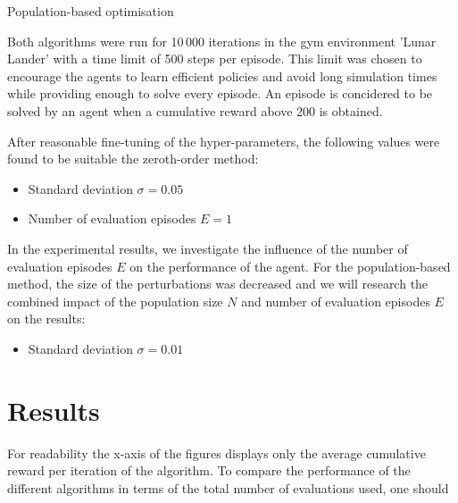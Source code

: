 \documentclass[10pt]{article}
\begin{document}
\begin{algorithm}
    \caption{Population-based optimisation}
    \label{alg:population}
\end{algorithm}

Both algorithms were run for 10\,000 iterations in the gym environment 'Lunar Lander' with a time limit of 500 steps per episode.
This limit was chosen to encourage the agents to learn efficient policies and avoid long simulation times while providing enough
to solve every episode. An episode is concidered to be solved by an agent when a cumulative reward above 200 is obtained.

After reasonable fine-tuning of the hyper-parameters, the following values were found to be suitable the zeroth-order method:
\begin{itemize}
    \item Standard deviation $\sigma=0.05$
    \item Number of evaluation episodes $E = 1$
\end{itemize}
In the experimental results, we investigate the influence of the number of evaluation episodes $E$ on the performance of the agent.
For the population-based method, the size of the perturbations was decreased and we will research the combined impact of the population size
$N$ and number of evaluation episodes $E$ on the results:
\begin{itemize}
    \item Standard deviation $\sigma=0.01$
\end{itemize}

\section{Results}

For readability the x-axis of the figures displays only the average cumulative reward per iteration of the
algorithm. To compare the performance of the different algorithms in terms of the total number of
evaluations used, one should 
\end{document}
